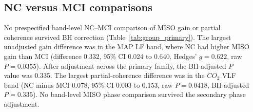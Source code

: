 \documentclass[12pt]{article}
\newcommand{\COtwo}{CO_2}
\begin{document}
\subsection{NC versus MCI comparisons}

No prespecified band-level NC--MCI comparison of MISO gain or partial coherence
survived BH correction (Table~\ref{tab:group_primary}). The largest unadjusted
gain difference was in the MAP LF band, where NC had higher MISO gain than MCI
(difference 0.332, 95\% CI 0.024 to 0.640, Hedges' $g=0.622$, raw $P=0.0355$).
After adjustment across the primary family, the BH-adjusted $P$ value was
0.335. The largest partial-coherence difference was in the $\COtwo$ VLF band
(NC minus MCI 0.078, 95\% CI 0.003 to 0.153, raw $P=0.0418$,
BH-adjusted $P=0.335$). No band-level MISO phase comparison survived the
secondary phase adjustment.
\end{document}
